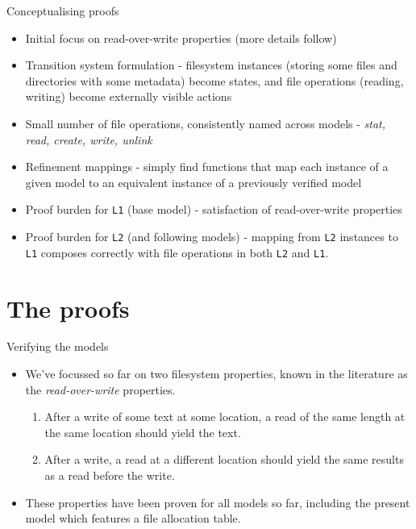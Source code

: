 \documentclass{beamer}
\begin{document}
\begin{frame}{Conceptualising proofs}
  \begin{itemize}
  \item Initial focus on read-over-write properties (more details follow)
  \item Transition system formulation - filesystem instances
    (storing some files and directories with some metadata) become
    states, and file operations (reading, writing) become externally
    visible actions
  \item Small number of file operations, consistently named across
    models - \textit{stat, read, create, write, unlink}
  \item Refinement mappings - simply find functions that map each
    instance of a given model to an equivalent instance of a
    previously verified model
  \item Proof burden for \texttt{L1} (base model) - satisfaction of
    read-over-write properties
  \item Proof burden for \texttt{L2} (and following models) - mapping
    from \texttt{L2} instances to \texttt{L1} composes correctly with
    file operations in both \texttt{L2} and \texttt{L1}.
  \end{itemize}
\end{frame}

\section{The proofs}

\begin{frame}{Verifying the models}
  \begin{itemize}
  \item We've focussed so far on two filesystem properties, known in
    the literature as the \textit{read-over-write} properties.
    \begin{enumerate}
    \item After a write of some text at some location, a read of the
      same length at the same location should yield the text.
    \item After a write, a read at a different location should yield
      the same results as a read before the write.
    \end{enumerate}
  \item These properties have been proven for all models so far,
    including the present model which features a file allocation
    table.
  \end{itemize}
\end{frame}
\end{document}
